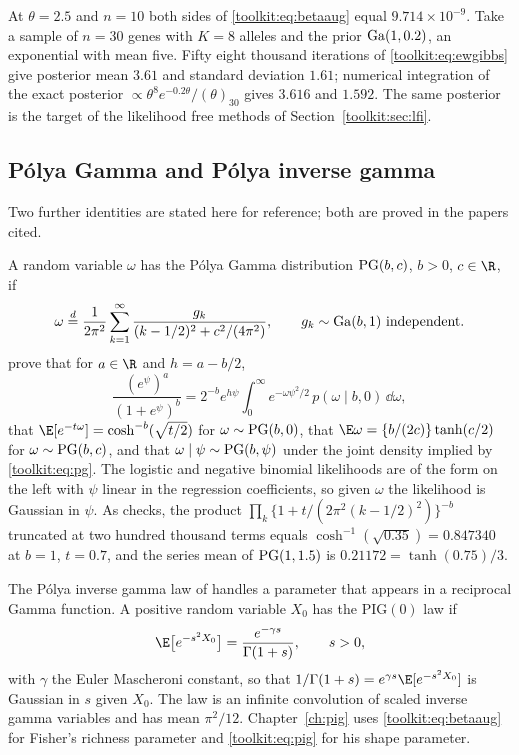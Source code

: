 \begin{example}\label{toolkit:ex:betaaug}
At $\theta=2.5$ and $n=10$ both sides of \eqref{toolkit:eq:betaaug} equal $9.714\times10^{-9}$. Take
a sample of $n=30$ genes with $K=8$ alleles and the prior $\mathrm{Ga}(1,0.2)$, an exponential with mean
five. Fifty eight thousand iterations of \eqref{toolkit:eq:ewgibbs} give posterior mean $3.61$ and
standard deviation $1.61$; numerical integration of the exact posterior
$\propto\theta^{8}e^{-0.2\theta}/(\theta)_{30}$ gives $3.616$ and $1.592$. The same posterior is
the target of the likelihood free methods of Section~\ref{toolkit:sec:lfi}.
\end{example}

\subsection{P\'olya Gamma and P\'olya inverse gamma}\label{toolkit:sec:pg}

Two further identities are stated here for reference; both are proved in the papers cited.

A random variable $\omega$ has the P\'olya Gamma distribution $\mathrm{PG}(b,c)$, $b>0$, $c\in\R$, if
\[
\omega\overset{d}{=}\frac{1}{2\pi^2}\sum_{k=1}^\infty\frac{g_k}{(k-1/2)^2+c^2/(4\pi^2)},\qquad
g_k\sim\mathrm{Ga}(b,1)\ \text{independent}.
\]
\citet{toolkit:polson2013} prove that for $a\in\R$ and $h=a-b/2$,
\begin{equation}\label{toolkit:eq:pg}
\frac{(e^{\psi})^a}{(1+e^{\psi})^b}=2^{-b}e^{h\psi}\int_0^\infty e^{-\omega\psi^2/2}\,p(\omega\mid b,0)\,\dd\omega,
\end{equation}
that $\E[e^{-t\omega}]=\cosh^{-b}(\sqrt{t/2})$ for $\omega\sim\mathrm{PG}(b,0)$, that
$\E\omega=\{b/(2c)\}\tanh(c/2)$ for $\omega\sim\mathrm{PG}(b,c)$, and that $\omega\mid\psi\sim\mathrm{PG}(b,\psi)$
under the joint density implied by \eqref{toolkit:eq:pg}. The logistic and negative binomial
likelihoods are of the form on the left with $\psi$ linear in the regression coefficients, so
given $\omega$ the likelihood is Gaussian in $\psi$. As checks, the product
$\prod_k\{1+t/(2\pi^2(k-1/2)^2)\}^{-b}$ truncated at two hundred thousand terms equals
$\cosh^{-1}(\sqrt{0.35})=0.847340$ at $b=1$, $t=0.7$, and the series mean of $\mathrm{PG}(1,1.5)$ is
$0.21172=\tanh(0.75)/3$.

The P\'olya inverse gamma law of \citet{toolkit:he2022} handles a parameter that appears in a
reciprocal Gamma function. A positive random variable $X_0$ has the $\mathrm{PIG}(0)$ law if
\begin{equation}\label{toolkit:eq:pig}
\E\big[e^{-s^2X_0}\big]=\frac{e^{-\gamma s}}{\Gamma(1+s)},\qquad s>0,
\end{equation}
with $\gamma$ the Euler Mascheroni constant, so that $1/\Gamma(1+s)=e^{\gamma s}\E[e^{-s^2X_0}]$
is Gaussian in $s$ given $X_0$. The law is an infinite convolution of scaled inverse gamma
variables and has mean $\pi^2/12$. Chapter~\ref{ch:pig} uses \eqref{toolkit:eq:betaaug} for
Fisher's richness parameter and \eqref{toolkit:eq:pig} for his shape parameter.

